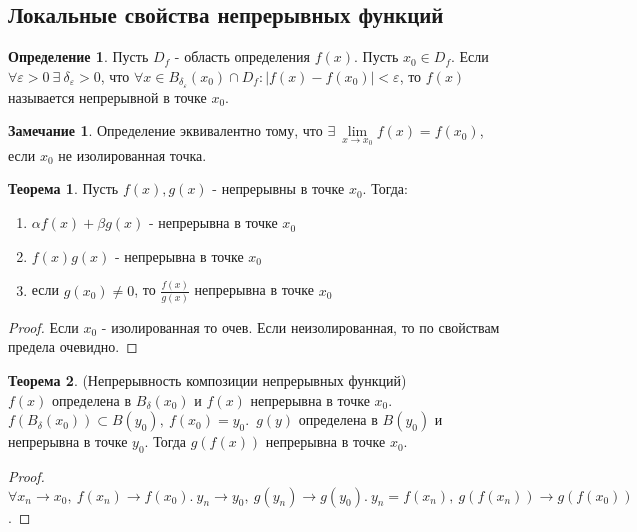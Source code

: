 \documentclass[a4paper, 12pt]{article}
\renewcommand{\epsilon}{\varepsilon}
\theoremstyle{definition}
\newtheorem*{definition}{Определение}
\newtheorem*{theorem}{Теорема}
\newtheorem*{comm}{Замечание}
\begin{document}
    \subsection{Локальные свойства непрерывных функций}
        \begin{definition}
            Пусть $D_f$ - область определения $f(x)$. Пусть $x_0\in D_f$. Если $\forall \epsilon>0\ \exists\ \delta_{\epsilon}>0$, что $\forall x\in B_{\delta_{\epsilon}}(x_0)\cap D_f: |f(x)-f(x_0)|<\epsilon$, то $f(x)$ называется непрерывной в точке $x_0$.
        \end{definition}  
        \begin{comm}
            Определение эквивалентно тому, что $\exists\ \lim\limits_{x\to x_0}f(x)=f(x_0)$, если $x_0$ не изолированная точка.
        \end{comm} 
        \begin{theorem}
            Пусть $f(x),g(x)$ - непрерывны в точке $x_0$. Тогда:
            \begin{enumerate}
                \item $\alpha f(x)+\beta g(x)$ - непрерывна в точке $x_0$
                \item $f(x)g(x)$ - непрерывна в точке $x_0$
                \item если $g(x_0)\ne 0$, то $\frac{f(x)}{g(x)}$ непрерывна в точке $x_0$
            \end{enumerate}
        \end{theorem} 
        \begin{proof}
            Если $x_0$ - изолированная то очев. Если неизолированная, то по свойствам предела очевидно.
        \end{proof} 
        \begin{theorem} (Непрерывность композиции непрерывных функций) \\
            $f(x)$ определена в $B_{\delta}(x_0)$ и $f(x)$ непрерывна в точке $x_0$.\ $f(B_{\delta}(x_0))\subset B(y_0),\ f(x_0)=y_0$.\ $g(y)$ определена в $B(y_0)$ и непрерывна в точке $y_0$. Тогда $g(f(x))$ непрерывна в точке $x_0$.
        \end{theorem} 
        \begin{proof}
            $\forall x_n\to x_0,\ f(x_n)\to f(x_0).\ y_n\to y_0,\ g(y_n)\to g(y_0).\ y_n=f(x_n),\ g(f(x_n))\to g(f(x_0))$.
        \end{proof} 
\end{document}

